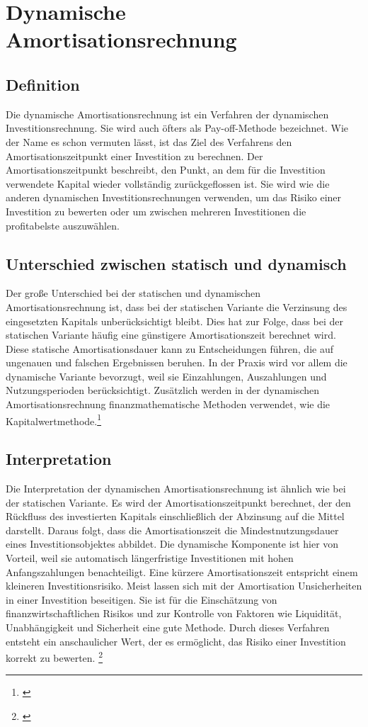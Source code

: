 \chapter{Dynamische Amortisationsrechnung}
\label{Dynamische Amortisationsrechnung}

\section{Definition}
Die dynamische Amortisationsrechnung ist ein Verfahren der dynamischen Investitionsrechnung. Sie wird auch öfters als Pay-off-Methode bezeichnet. Wie der Name es schon vermuten lässt, ist das Ziel des Verfahrens den Amortisationszeitpunkt einer Investition zu berechnen. Der Amortisationszeitpunkt beschreibt, den Punkt, an dem für die Investition verwendete Kapital wieder vollständig zurückgeflossen ist. Sie wird wie die anderen dynamischen Investitionsrechnungen verwenden, um das Risiko einer Investition zu bewerten oder um zwischen mehreren Investitionen die profitabelste auszuwählen.
\section{Unterschied zwischen statisch und dynamisch}
Der große Unterschied bei der statischen und dynamischen Amortisationsrechnung ist, dass bei der statischen Variante die Verzinsung des eingesetzten Kapitals unberücksichtigt bleibt. Dies hat zur Folge, dass bei der statischen Variante häufig eine günstigere Amortisationszeit berechnet wird. Diese statische Amortisationsdauer kann zu Entscheidungen führen, die auf ungenauen und falschen Ergebnissen beruhen. In der Praxis wird vor allem die dynamische Variante bevorzugt, weil sie Einzahlungen, Auszahlungen und Nutzungsperioden berücksichtigt. Zusätzlich werden in der dynamischen Amortisationsrechnung finanzmathematische Methoden verwendet, wie die Kapitalwertmethode.\footnote{\cite{gevestor}}
\newpage
\section{Interpretation}
Die Interpretation der dynamischen Amortisationsrechnung ist  ähnlich wie bei der statischen Variante. Es wird der Amortisationszeitpunkt berechnet, der den Rückfluss des investierten Kapitals einschließlich der Abzinsung auf die Mittel darstellt. Daraus folgt, dass die Amortisationszeit die Mindestnutzungsdauer eines Investitionsobjektes abbildet. Die dynamische Komponente ist hier von Vorteil, weil sie automatisch längerfristige Investitionen mit hohen Anfangszahlungen benachteiligt. Eine kürzere Amortisationszeit entspricht einem kleineren Investitionsrisiko. Meist lassen sich mit der Amortisation Unsicherheiten in einer Investition beseitigen. Sie ist für die Einschätzung von finanzwirtschaftlichen Risikos und zur Kontrolle von Faktoren wie Liquidität, Unabhängigkeit und Sicherheit eine gute Methode. Durch dieses Verfahren entsteht ein anschaulicher Wert, der es ermöglicht, das Risiko einer Investition korrekt zu bewerten.
\footnote{\cite{gevestor}}
